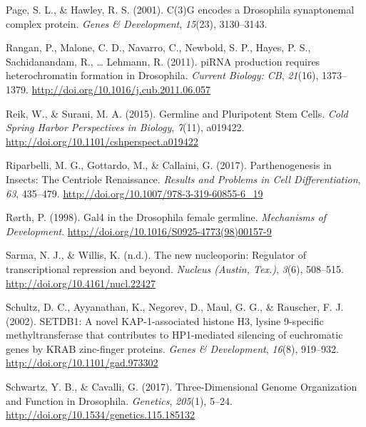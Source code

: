 \documentclass[12pt,oneside]{reedthesis}
\begin{document}
\leavevmode\hypertarget{ref-pageEncodesDrosophilaSynaptonemal2001a}{}%
Page, S. L., \& Hawley, R. S. (2001). C(3)G encodes a Drosophila synaptonemal complex protein. \emph{Genes \& Development}, \emph{15}(23), 3130--3143.

\leavevmode\hypertarget{ref-ranganPiRNAProductionRequires2011a}{}%
Rangan, P., Malone, C. D., Navarro, C., Newbold, S. P., Hayes, P. S., Sachidanandam, R., \ldots{} Lehmann, R. (2011). piRNA production requires heterochromatin formation in Drosophila. \emph{Current Biology: CB}, \emph{21}(16), 1373--1379. \url{http://doi.org/10.1016/j.cub.2011.06.057}

\leavevmode\hypertarget{ref-reikGermlinePluripotentStem2015}{}%
Reik, W., \& Surani, M. A. (2015). Germline and Pluripotent Stem Cells. \emph{Cold Spring Harbor Perspectives in Biology}, \emph{7}(11), a019422. \url{http://doi.org/10.1101/cshperspect.a019422}

\leavevmode\hypertarget{ref-riparbelliParthenogenesisInsectsCentriole2017}{}%
Riparbelli, M. G., Gottardo, M., \& Callaini, G. (2017). Parthenogenesis in Insects: The Centriole Renaissance. \emph{Results and Problems in Cell Differentiation}, \emph{63}, 435--479. \url{http://doi.org/10.1007/978-3-319-60855-6_19}

\leavevmode\hypertarget{ref-rorthGal4DrosophilaFemale1998}{}%
Rørth, P. (1998). Gal4 in the Drosophila female germline. \emph{Mechanisms of Development}. \url{http://doi.org/10.1016/S0925-4773(98)00157-9}

\leavevmode\hypertarget{ref-sarmaNewNucleoporinRegulator2012}{}%
Sarma, N. J., \& Willis, K. (n.d.). The new nucleoporin: Regulator of transcriptional repression and beyond. \emph{Nucleus (Austin, Tex.)}, \emph{3}(6), 508--515. \url{http://doi.org/10.4161/nucl.22427}

\leavevmode\hypertarget{ref-schultzSETDB1NovelKAP1associated2002}{}%
Schultz, D. C., Ayyanathan, K., Negorev, D., Maul, G. G., \& Rauscher, F. J. (2002). SETDB1: A novel KAP-1-associated histone H3, lysine 9-specific methyltransferase that contributes to HP1-mediated silencing of euchromatic genes by KRAB zinc-finger proteins. \emph{Genes \& Development}, \emph{16}(8), 919--932. \url{http://doi.org/10.1101/gad.973302}

\leavevmode\hypertarget{ref-schwartzThreeDimensionalGenomeOrganization2017}{}%
Schwartz, Y. B., \& Cavalli, G. (2017). Three-Dimensional Genome Organization and Function in Drosophila. \emph{Genetics}, \emph{205}(1), 5--24. \url{http://doi.org/10.1534/genetics.115.185132}
\end{document}
